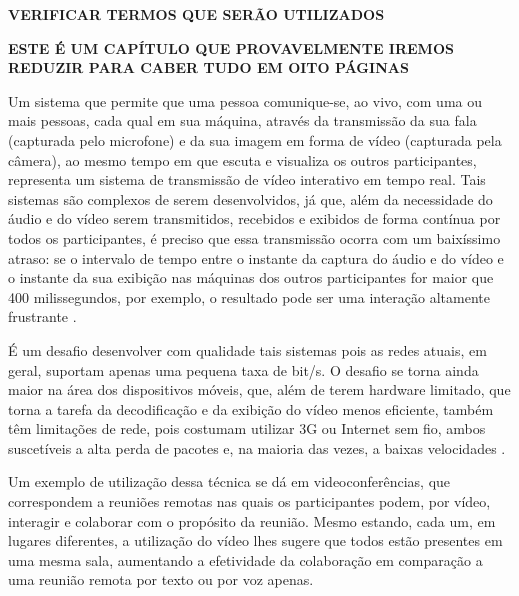 \documentclass{acm_proc_article-sp}
\newcommand{\todo}[1]{\textcolor[rgb]{1.00,0.00,0.00}{\bf \uppercase{#1}}}
\begin{document}
\todo{verificar termos que serão utilizados}

\todo{este é um capítulo que provavelmente iremos reduzir para caber tudo em oito páginas}

Um sistema que permite que uma pessoa comunique-se, ao vivo, com uma ou mais
pessoas, cada qual em sua máquina, através da transmissão da sua fala (capturada pelo microfone) e da sua imagem em forma de vídeo (capturada pela câmera), ao mesmo tempo em que escuta e visualiza os outros participantes, representa um sistema de transmissão de vídeo interativo em tempo real. Tais sistemas são complexos de serem desenvolvidos, já que, além da necessidade do áudio e do vídeo serem transmitidos, recebidos e exibidos de forma contínua por todos os participantes, é preciso que essa transmissão ocorra com um baixíssimo atraso: se o intervalo de tempo entre o instante da captura do áudio e do vídeo e o instante da sua exibição nas máquinas dos outros participantes for maior que 400 milissegundos, por exemplo, o resultado pode ser uma interação altamente frustrante \cite{kurose_2001}.

É um desafio desenvolver com qualidade tais sistemas pois as redes atuais, em geral, suportam apenas uma pequena taxa de bit/s. O desafio se torna ainda maior na área dos dispositivos móveis, que, além de terem hardware limitado, que torna a tarefa da decodificação e da exibição do vídeo menos eficiente, também têm limitações de rede, pois costumam utilizar 3G ou Internet sem fio, ambos suscetíveis a alta perda de pacotes e, na maioria das vezes, a baixas velocidades \cite{huynh-thu_2008}.

Um exemplo de utilização dessa técnica se dá em videoconferências, que correspondem a reuniões remotas nas quais os participantes podem, por vídeo, interagir e colaborar com o propósito da reunião. Mesmo estando, cada um, em lugares diferentes, a utilização do vídeo lhes sugere que todos estão presentes em uma mesma sala, aumentando a efetividade da colaboração em comparação a uma reunião remota por texto ou por voz apenas.
\end{document}
